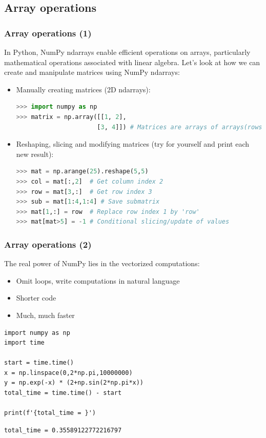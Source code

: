 \subsection{Array operations}
\begin{frame}[fragile]
  \frametitle{Array operations (1)}
  In Python, NumPy ndarrays enable efficient operations on arrays, particularly mathematical operations associated with linear algebra. Let's look at how we can create and manipulate matrices using NumPy ndarrays:
  \begin{itemize}
    \item Manually creating matrices (2D ndarrays):
    \begin{lstlisting}[language=Python, numbers=none]
>>> import numpy as np
>>> matrix = np.array([[1, 2], 
                      [3, 4]]) # Matrices are arrays of arrays(rows)
    \end{lstlisting}\pause

    \item Reshaping, slicing and modifying matrices (try for yourself and print each new result):
    \begin{lstlisting}[language=Python, numbers=none]
>>> mat = np.arange(25).reshape(5,5)
>>> col = mat[:,2]  # Get column index 2
>>> row = mat[3,:]  # Get row index 3
>>> sub = mat[1:4,1:4] # Save submatrix
>>> mat[1,:] = row  # Replace row index 1 by 'row'
>>> mat[mat>5] = -1 # Conditional slicing/update of values
    \end{lstlisting}
  \end{itemize}
\end{frame}

\begin{frame}[fragile]
  \frametitle{Array operations (2)}
  The real power of NumPy lies in the vectorized computations:
  \begin{itemize}
    \item Omit loops, write computations in natural language
    \item Shorter code
    \item Much, much faster
  \end{itemize}
  \pause
  \begin{lstlisting}
import numpy as np
import time

start = time.time()
x = np.linspace(0,2*np.pi,10000000)
y = np.exp(-x) * (2+np.sin(2*np.pi*x))
total_time = time.time() - start

print(f'{total_time = }')
  \end{lstlisting}
  \begin{lstlisting}[style=PyOutput]
total_time = 0.35589122772216797
  \end{lstlisting}
\end{frame}


